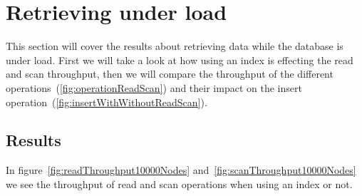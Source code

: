 \section{Retrieving under load}
\label{ch:evaluation:se:retrievingUnderLoad}
This section will cover the results about retrieving data while the database is under load.
First we will take a look at how using an index is effecting the read and scan throughput,
then we will compare the throughput of the different operations~(\ref{fig:operationReadScan}) and their impact on the insert operation~(\ref{fig:insertWithWithoutReadScan}).

\subsection{Results}
In figure~\ref{fig:readThroughput10000Nodes} and~\ref{fig:scanThroughput10000Nodes} we see the throughput of read and scan operations when using an index or not.

